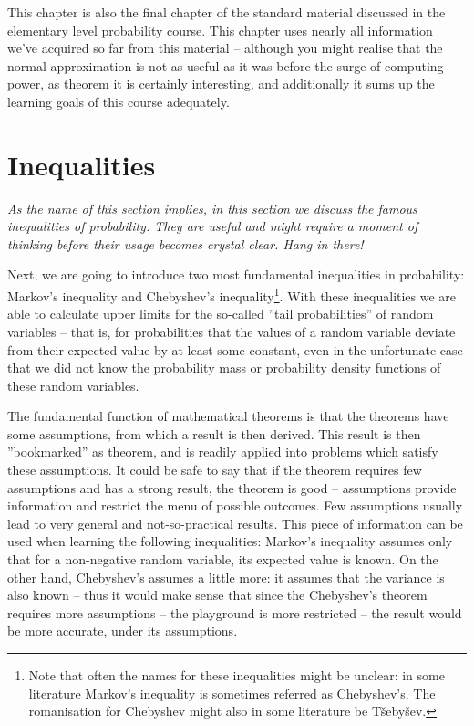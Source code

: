 \documentclass[12pt,a4paper,leqno]{report}
\theoremstyle{plain}
\theoremstyle{definition}
\begin{document}
This chapter is also the final chapter of the standard material discussed in the elementary level probability course. This chapter uses nearly all information we've acquired so far from this material -- although you might realise that the normal approximation is not as useful as it was before the surge of computing power, as theorem it is certainly interesting, and additionally it sums up the learning goals of this course adequately. 

\section{Inequalities}

\emph{As the name of this section implies, in this section we discuss the famous inequalities of probability. They are useful and might require a moment of thinking before their usage becomes crystal clear. Hang in there!}

Next, we are going to introduce two most fundamental inequalities in probability: Markov's inequality and Chebyshev's inequality\footnote{Note that often the names for these inequalities might be unclear: in some literature Markov's inequality is sometimes referred as Chebyshev's. The romanisation for Chebyshev might also in some literature be T\v{s}eby\v{s}ev.}. With these inequalities we are able to calculate upper limits for the so-called ''tail probabilities'' of random variables -- that is, for probabilities that the values of a random variable deviate from their expected value by at least some constant, even in the unfortunate case that we did not know the probability mass or probability density functions of these random variables.

The fundamental function of mathematical theorems is that the theorems have some assumptions, from which a result is then derived. This result is then ''bookmarked'' as theorem, and is readily applied into problems which satisfy these assumptions. It could be safe to say that if the theorem requires few assumptions and has a strong result, the theorem is good -- assumptions provide information and restrict the menu of possible outcomes. Few assumptions usually lead to very general and not-so-practical results. This piece of information can be used when learning the following inequalities: Markov's inequality assumes only that for a non-negative random variable, its expected value is known. On the other hand, Chebyshev's assumes a little more: it assumes that the variance is also known -- thus it would make sense that since the Chebyshev's theorem requires more assumptions -- the playground is more restricted -- the result would be more accurate, under its assumptions.
\end{document}
